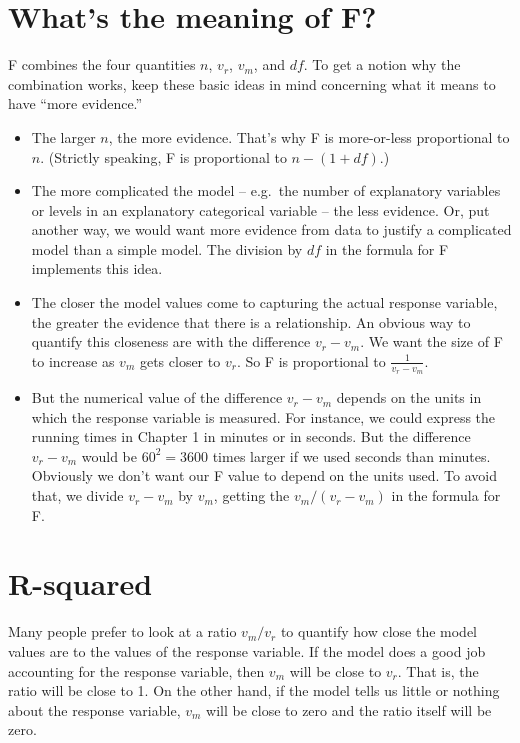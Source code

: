 \documentclass[]{tufte-book}
\providecommand{\tightlist}{%
  \setlength{\itemsep}{0pt}\setlength{\parskip}{0pt}}
\begin{document}
\hypertarget{whats-the-meaning-of-f}{%
\section{What's the meaning of F?}\label{whats-the-meaning-of-f}}

F combines the four quantities \(n\), \(v_r\), \(v_m\), and \(df\). To get a notion why the combination works, keep these basic ideas in mind concerning what it means to have ``more evidence.''

\begin{itemize}
\tightlist
\item
  The larger \(n\), the more evidence. That's why F is more-or-less proportional to \(n\). (Strictly speaking, F is proportional to \(n - (1+df)\).)
\item
  The more complicated the model -- e.g.~the number of explanatory variables or levels in an explanatory categorical variable -- the less evidence. Or, put another way, we would want more evidence from data to justify a complicated model than a simple model. The division by \(df\) in the formula for F implements this idea.
\item
  The closer the model values come to capturing the actual response variable, the greater the evidence that there is a relationship. An obvious
  way to quantify this closeness are with the difference \(v_r - v_m\). We want the size of F to increase as \(v_m\) gets closer to \(v_r\). So F is proportional to \(\frac{1}{v_r - v_m}\).
\item
  But the numerical value of the difference \(v_r - v_m\) depends on the units in which the response variable is measured. For instance, we could express the running times in Chapter 1 in minutes or in seconds. But the difference \(v_r - v_m\) would be \(60^2 = 3600\) times larger if we used seconds than minutes. Obviously we don't want our F value to depend on the units used. To avoid that, we divide \(v_r - v_m\) by \(v_m\), getting the \(v_m / (v_r - v_m)\) in the formula for F.
\end{itemize}

\hypertarget{r-squared}{%
\section{R-squared}\label{r-squared}}

Many people prefer to look at a ratio \(v_m / v_r\) to quantify how close the model values are to the values of the response variable. If the model does a good job accounting for the response variable, then \(v_m\) will be close to \(v_r\). That is, the ratio will be close to 1. On the other hand, if the model tells us little or nothing about the response variable, \(v_m\) will be close to zero and the ratio itself will be zero.
\end{document}
